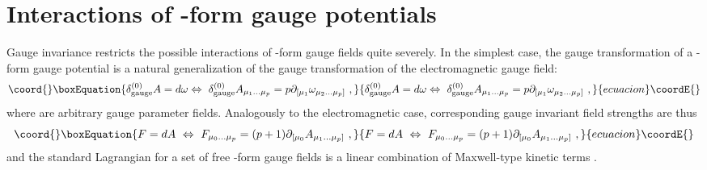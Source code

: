 \documentclass[a4paper,12pt]{article}
\begin{document}
\section{Interactions of \coordHE{}-form gauge potentials}\label{bra-sec2}

Gauge invariance restricts the possible interactions
of \coordHE{}-form gauge fields quite severely. In the simplest case,
the gauge transformation of 
a \coordHE{}-form gauge potential \coordHE{} is a natural
generalization of the gauge transformation of the 
electromagnetic gauge field:
\begin{equation}\coord{}\boxEquation{
\delta_\mathrm{gauge}^{(0)}A=d\omega\Leftrightarrow\
\delta_\mathrm{gauge}^{(0)}A_{\mu_1\dots\mu_p}=
p\partial _{[\mu_1}\omega_{\mu_2\dots\mu_p]}\ ,
}{
\delta_\mathrm{gauge}^{(0)}A=d\omega\Leftrightarrow\
\delta_\mathrm{gauge}^{(0)}A_{\mu_1\dots\mu_p}=
p\partial _{[\mu_1}\omega_{\mu_2\dots\mu_p]}\ ,
}{ecuacion}\coordE{}\end{equation}
where \coordHE{} are arbitrary gauge
parameter fields. Analogously to
the electromagnetic case, corresponding  gauge invariant
field strengths are thus
\begin{equation}\coord{}\boxEquation{
F=dA\ \Leftrightarrow\ F_{\mu_0\dots\mu_p}=(p+1)
\partial _{[\mu_0}A_{\mu_1\dots\mu_p]}\ ,
}{
F=dA\ \Leftrightarrow\ F_{\mu_0\dots\mu_p}=(p+1)
\partial _{[\mu_0}A_{\mu_1\dots\mu_p]}\ ,
}{ecuacion}\coordE{}\end{equation}
and the standard
Lagrangian for a set of free \coordHE{}-form gauge fields
is a linear combination of Maxwell-type kinetic terms
\myHighlight{$F_{\mu_0\dots\mu_p}F^{\mu_0\dots\mu_p}$}\coordHE{}.
\end{document}
